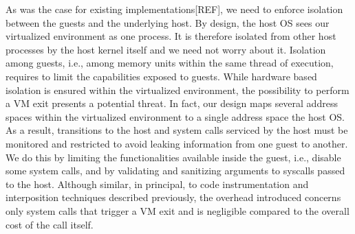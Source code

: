 \documentclass[letterpaper,twocolumn,10pt]{article}
\begin{document}
As was the case for existing implementations[REF], we need to enforce isolation between the guests and the underlying host.
By design, the host OS sees our virtualized environment as one process.
It is therefore isolated from other host processes by the host kernel itself and we need not worry about it.
Isolation among guests, i.e., among memory units within the same thread of execution, requires to limit the capabilities exposed to guests.
While hardware based isolation is ensured within the virtualized environment, the possibility to perform a VM exit presents a potential threat.
In fact, our design maps several address spaces within the virtualized environment to a single address space the host OS.
As a result, transitions to the host and system calls serviced by the host must be monitored and restricted to avoid leaking information from one guest to another. 
We do this by limiting the functionalities available inside the guest, i.e., disable some system calls, and by validating and sanitizing arguments to syscalls passed to the host.
Although similar, in principal, to code instrumentation and interposition techniques described previously, the overhead introduced concerns only system calls that trigger a VM exit and is negligible compared to the overall cost of the call itself. \\




\end{document}
